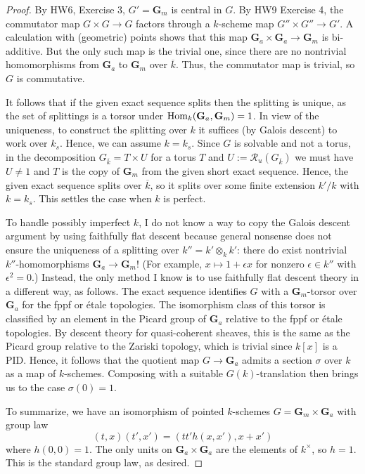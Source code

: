 \documentclass[10pt]{article}
\renewcommand{\(}{\left(}
\renewcommand{\)}{\right)}
\numberwithin{thm}{subsection}
\begin{document}
\begin{proof}
By HW6, Exercise 3, $G' = \mathbf{G}_m$ is central in $G$.   By HW9 Exercise 4, 
the commutator map $G \times G \rightarrow G$ factors through a $k$-scheme map
$G'' \times G'' \rightarrow G'$.  A calculation with (geometric) points shows that
this map $\mathbf{G}_a \times \mathbf{G}_a \rightarrow \mathbf{G}_m$
is bi-additive.  But the only such map is the trivial one, since there are
no nontrivial homomorphisms from $\mathbf{G}_a$ to $\mathbf{G}_m$ over
$\overline{k}$.  Thus, the commutator map is trivial, so $G$ is commutative. 

It follows that if the given exact sequence splits then the splitting is unique, as the set of 
splittings is a torsor under ${\rm{Hom}}_k(\mathbf{G}_a, \mathbf{G}_m) = 1$.
In view of the uniqueness, to construct the splitting over $k$ it suffices
(by Galois descent) to work over $k_s$.  Hence, we can assume $k = k_s$. 
Since $G$ is solvable and not a torus, in the decomposition
$G_{\overline{k}} = T \times U$ for a torus $T$ and 
$U := \mathscr{R}_u(G_{\overline{k}})$ we must have $U \ne 1$
and $T$ is the copy of $\mathbf{G}_m$ from the given short exact sequence. 
Hence, the given exact sequence splits over $\overline{k}$,
so it splits over some finite extension $k'/k$ with $k = k_s$.  
This settles the case when $k$ is perfect.  

To handle possibly imperfect $k$, I do not know a way to copy the Galois descent
argument by using faithfully flat descent because general nonsense does
not ensure the uniqueness of a splitting over $k'' = k' \otimes_k k'$: 
there do exist nontrivial $k''$-homomorphisms $\mathbf{G}_a \rightarrow \mathbf{G}_m$!
(For example, $x \mapsto 1 + \epsilon x$ for nonzero $\epsilon \in k''$ with
$\epsilon^2 = 0$.)   Instead, the only method I know is to use
faithfully flat descent theory in a different way, as follows. 
The exact sequence identifies $G$ with a $\mathbf{G}_m$-torsor
over $\mathbf{G}_a$ for the fppf or \'etale topologies.  
The isomorphism class of this torsor is classified by an element
in the Picard group of $\mathbf{G}_a$ relative to the fppf or \'etale topologies.
By descent theory for quasi-coherent sheaves, this is the same as the Picard
group relative to the Zariski topology, which is trivial since
$k[x]$ is a PID.  Hence, it follows that the quotient map
$G \rightarrow \mathbf{G}_a$ admits a section $\sigma$ over
$k$ as a map of $k$-schemes.  Composing with a suitable $G(k)$-translation
then brings us to the case $\sigma(0) = 1$.

To summarize, we have an isomorphism of pointed $k$-schemes
$G = \mathbf{G}_m \times \mathbf{G}_a$
with group law
$$(t,x)(t',x') = (tt' h(x,x'), x + x')$$
where $h(0,0) = 1$.   The only units on $\mathbf{G}_a \times \mathbf{G}_a$ 
are the elements of $k^{\times}$, so $h = 1$.   This is the standard group law, as desired. 
\end{proof}
\end{document}
